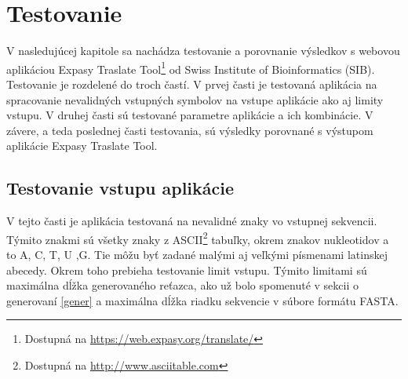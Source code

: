 \chapter{Testovanie}
V nasledujúcej kapitole sa nachádza testovanie a porovnanie výsledkov s webovou aplikáciou Expasy Traslate Tool\footnote{Dostupná na \href{https://web.expasy.org/translate/}{https://web.expasy.org/translate/}} od Swiss Institute of Bioinformatics (SIB). Testovanie je rozdelené do troch častí. V prvej časti je testovaná aplikácia na spracovanie nevalidných vstupných symbolov na vstupe aplikácie ako aj limity vstupu. V druhej časti sú testované parametre aplikácie a ich kombinácie. V závere, a teda poslednej časti testovania, sú výsledky porovnané s výstupom aplikácie Expasy Traslate Tool.

\section{Testovanie vstupu aplikácie}
V tejto časti je aplikácia testovaná na nevalidné znaky vo vstupnej sekvencii. Týmito znakmi sú všetky znaky z ASCII\footnote{Dostupná na \href{http://www.asciitable.com}{http://www.asciitable.com}} tabuľky, okrem znakov nukleotidov a to A, C, T, U ,G. Tie môžu byť zadané malými aj veľkými písmenami latinskej abecedy. Okrem toho prebieha testovanie limit vstupu. Týmito limitami sú maximálna dĺžka generovaného reťazca, ako už bolo spomenuté v sekcii o generovaní \ref{gener} a maximálna dĺžka riadku sekvencie v súbore formátu FASTA.
